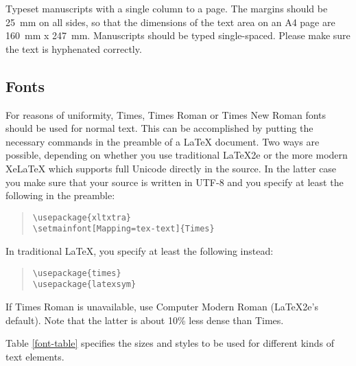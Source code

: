 \documentclass[a4paper,11pt]{article}
\begin{document}
Typeset manuscripts with a single column to a page.
The margins should be 25~mm on all sides, so that
the dimensions of the text area on an A4 page are 160~mm x 247~mm.
Manuscripts should be typed single-spaced.
Please make sure the text is hyphenated correctly.


\subsection{Fonts}

For reasons of uniformity, Times, Times Roman or Times New Roman fonts should be
used for normal text. This can be accomplished by putting the necessary commands
in the preamble of a LaTeX document. Two ways are possible, depending on whether you
use traditional LaTeX2e or the more modern XeLaTeX which supports
full Unicode directly in the source. In the latter case you make sure that your source is written
in UTF-8 and you specify at least the following in the preamble:

\begin{quote}
\begin{verbatim}
\usepackage{xltxtra}
\setmainfont[Mapping=tex-text]{Times}
\end{verbatim}
\end{quote}

In traditional LaTeX, you specify at least the following instead:

\begin{quote}
\begin{verbatim}
\usepackage{times}
\usepackage{latexsym}
\end{verbatim}
\end{quote}
 If Times Roman is unavailable, use Computer
 Modern Roman (LaTeX2e's default).  Note that the latter is about
 10\% less dense than Times.

Table \ref{font-table} specifies the sizes and styles to be used for 
different kinds of text elements.
\end{document}
